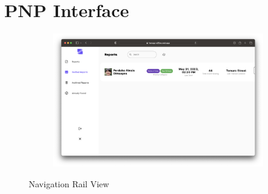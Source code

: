 %
%
%                 

\chapter{PNP Interface}
\label{sec:appendixb}
\begin{figure}[!h]
    \centering
    \begin{subfigure}[c]{1\linewidth}
        \centering
        \includegraphics[scale=0.25]{figures/Chapter4/PNP/Verified.png}
    \end{subfigure}
    \caption{Navigation Rail View}
    \label{fig:NavRail}
\end{figure}

